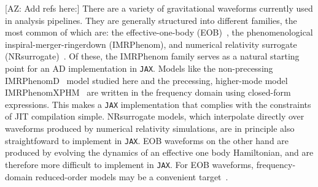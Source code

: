 \documentclass[twocolumn]{aastex631}
\newcommand{\jax}{\texttt{JAX}\xspace}
\newcommand{\te}[1]{\textbf{\color{pyGreen}(TE: #1)}}
\newcommand{\AZ}[1]{{\color{Burnt}[AZ: #1]}}
\begin{document}
\AZ{Add refs here:}
There are a variety of gravitational waveforms currently used in analysis pipelines.
They are generally structured into different families, the most common of which are: the effective-one-body (EOB)~\citep{Damour:2008yg,Buonanno:2005xu, Buonanno:2000ef, Buonanno:1998gg, Damour:2000we}, the phenomenological inspiral-merger-ringerdown (IMRPhenom), and numerical relativity surrogate (NRsurrogate)~\citep{Varma:2018mmi,Varma:2019csw}.
Of these, the IMRPhenom family serves as a natural starting point for an AD implementation in \jax.
Models like the non-precessing IMRPhenomD~\citep{Khan:2015jqa} model studied here and the precessing, higher-mode model IMRPhenomXPHM~\citep{Pratten:2020fqn, Pratten:2020ceb} are written in the frequency domain using closed-form expressions.
This makes a
\jax implementation that complies with the constraints of JIT compilation simple.
NRsurrogate models, which interpolate directly over waveforms produced by numerical relativity simulations, are in principle also straightfoward to implement in \jax.
EOB waveforms on the other hand are produced by evolving the dynamics of an effective one body Hamiltonian, and are therefore more difficult to implement in \jax.
For EOB waveforms, frequency-domain reduced-order models may be a convenient target~\citep[e.g.][]{Cotesta:2020qhw}.
\end{document}

